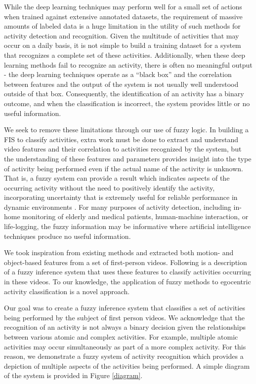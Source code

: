 \documentclass[12pt]{report}
\begin{document}
While the deep learning techniques may perform well for a small set of actions when trained against extensive annotated datasets, the requirement of massive amounts of labeled data is a huge limitation in the utility of such methods for activity detection and recognition. Given the multitude of activities that may occur on a daily basis, it is not simple to build a training dataset for a system that recognizes a complete set of these activities. Additionally, when these deep learning methods fail to recognize an activity, there is often no meaningful output - the deep learning techniques operate as a “black box” and the correlation between features and the output of the system is not usually well understood outside of that box. Consequently, the identification of an activity has a binary outcome, and when the classification is incorrect, the system provides little or no useful information.

We seek to remove these limitations through our use of fuzzy logic. In building a FIS to classify activities, extra work must be done to extract and understand video features and their correlation to activities recognized by the system, but the understanding of these features and parameters provides insight into the type of activity being performed even if the actual name of the activity is unknown. That is, a fuzzy system can provide a result which indicates aspects of the occurring activity without the need to positively identify the activity, incorporating uncertainty that is extremely useful for reliable performance in dynamic environments \cite{Anderson2009}. For many purposes of activity detection, including in-home monitoring of elderly \cite{Banerjee2015, Anderson2009a} and medical patients, human-machine interaction, or life-logging, the fuzzy information may be informative where artificial intelligence techniques produce no useful information.

We took inspiration from existing methods and extracted both motion- and object-based features from a set of first-person videos. Following is a description of a fuzzy inference system that uses these features to classify activities occurring in these videos. To our knowledge, the application of fuzzy methods to egocentric activity classification is a novel approach.

Our goal was to create a fuzzy inference system that classifies a set of activities being performed by the subject of first person videos. We acknowledge that the recognition of an activity is not always a binary decision given the relationships between various atomic and complex activities. For example, multiple atomic activities may occur simultaneously as part of a more complex activity. For this reason, we demonstrate a fuzzy system of activity recognition which provides a depiction of multiple aspects of the activities being performed. A simple diagram of the system is provided in Figure \ref{diagram}.
\end{document}
